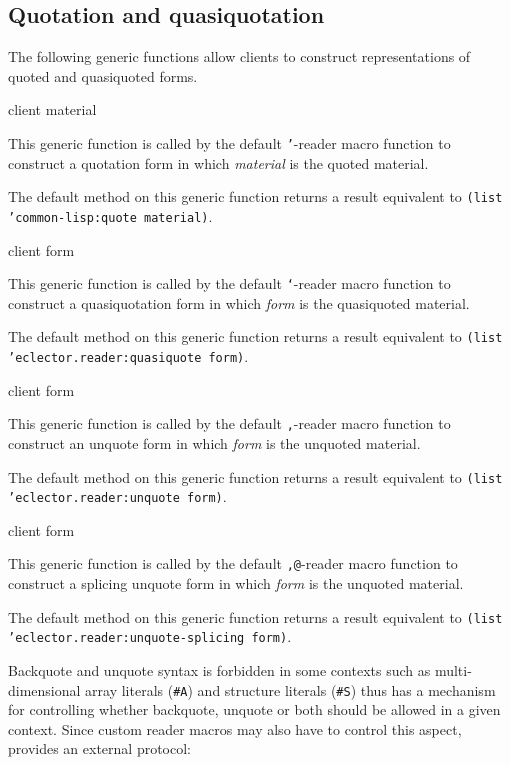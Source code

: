 \subsection{Quotation and quasiquotation}
\label{sec:quotation-and-quasiquotation}

The following generic functions allow clients to construct
representations of quoted and quasiquoted forms.

 {client material}

This generic function is called by the default \texttt{'}-reader macro
function to construct a quotation form in which \textit{material} is
the quoted material.

The default method on this generic function returns a result
equivalent to \texttt{(list 'common-lisp:quote material)}.

 {client form}

This generic function is called by the default \texttt{`}-reader macro
function to construct a quasiquotation form in which \textit{form} is
the quasiquoted material.

The default method on this generic function returns a result
equivalent to \texttt{(list 'eclector.reader:quasiquote form)}.

 {client form}

This generic function is called by the default \texttt{,}-reader macro
function to construct an unquote form in which \textit{form} is the
unquoted material.

The default method on this generic function returns a result
equivalent to \texttt{(list 'eclector.reader:unquote form)}.

 {client form}

This generic function is called by the default \texttt{,@}-reader
macro function to construct a splicing unquote form in which
\textit{form} is the unquoted material.

The default method on this generic function returns a result
equivalent to \texttt{(list 'eclector.reader:unquote-splicing form)}.

Backquote and unquote syntax is forbidden in some contexts such as
multi-dimensional array literals (\texttt{\#A}) and structure literals
(\texttt{\#S}) thus \sysname{} has a mechanism for controlling whether
backquote, unquote or both should be allowed in a given context.
Since custom reader macros may also have to control this aspect,
\sysname{} provides an external protocol:

